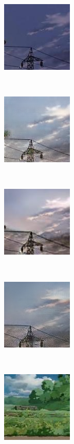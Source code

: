 \documentclass[conference]{IEEEtran}
\begin{document}
\begin{figure}[!htb]
\begin{center}
     \begin{subfigure}[normal]{0.2\textwidth}
         \includegraphics[scale = 0.7]{pic/96.jpg}
     \end{subfigure}
     ~
     \begin{subfigure}[normal]{0.2\textwidth}
         \includegraphics[scale = 0.7]{pic/cycle_spec96.png}
     \end{subfigure}
     ~
     \begin{subfigure}[normal]{0.2\textwidth}
         \includegraphics[scale = 0.7]{pic/outputUNIT96.jpg}
     \end{subfigure}
     ~
     \begin{subfigure}[normal]{0.2\textwidth}
         \includegraphics[scale = 0.93]{pic/singlegan96.jpg}
     \end{subfigure}
     \\%
     \begin{subfigure}[normal]{0.2\textwidth}
         \includegraphics[scale = 0.7]{pic/in_3.jpg}

\end{subfigure}
\end{center}
\end{figure}
\end{document}
